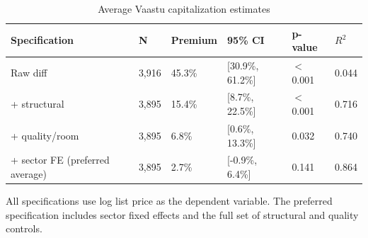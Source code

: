 \begin{table}[!htbp]
\centering
\caption{Average Vaastu capitalization estimates}
\label{tab:average-models}
\begin{tabular}{llllll}
\toprule
Specification & N & Premium & 95\% CI & p-value & $R^2$ \\
\midrule
Raw diff & 3,916 & 45.3\% & [30.9\%, 61.2\%] & $<$0.001 & 0.044 \\
+ structural & 3,895 & 15.4\% & [8.7\%, 22.5\%] & $<$0.001 & 0.716 \\
+ quality/room & 3,895 & 6.8\% & [0.6\%, 13.3\%] & 0.032 & 0.740 \\
+ sector FE (preferred average) & 3,895 & 2.7\% & [-0.9\%, 6.4\%] & 0.141 & 0.864 \\
\bottomrule
\end{tabular}

\vspace{0.3em}
\par\begin{minipage}{0.95\linewidth}\footnotesize All specifications use log list price as the dependent variable. The preferred specification includes sector fixed effects and the full set of structural and quality controls.\end{minipage}
\end{table}
